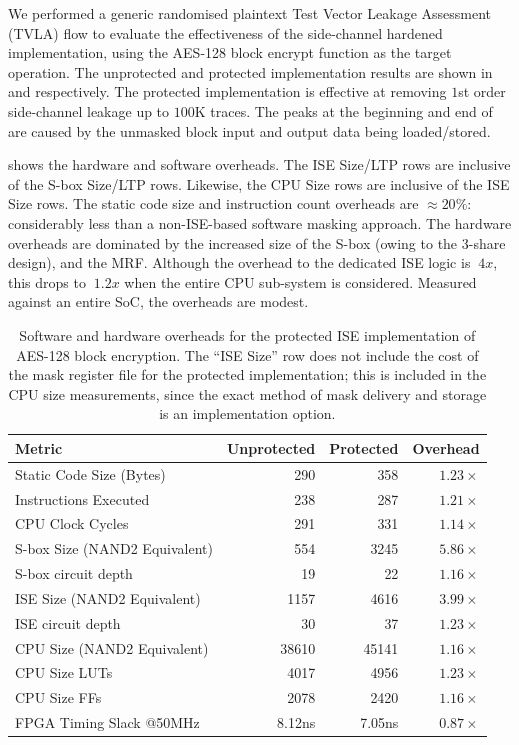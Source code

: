 We performed a generic randomised plaintext
Test Vector Leakage Assessment (TVLA) \cite{TVLA:13}
flow to evaluate the effectiveness of the side-channel hardened implementation,
using the AES-128 block encrypt function as the target operation.
The unprotected and protected implementation results are shown in
 and
 respectively.
The protected implementation is effective at removing $1$st
order side-channel leakage up to $100$K traces.
The peaks at the beginning and end of 
are caused by the unmasked block input and output data being loaded/stored.

 shows the hardware and software overheads.
The ISE Size/LTP rows are inclusive of the S-box Size/LTP rows.
Likewise, the CPU Size rows are inclusive of the ISE Size rows.
The static code size and instruction count overheads are
$\approx 20\%$: considerably less than a non-ISE-based software masking
approach.
The hardware overheads are dominated by the increased size of the
S-box (owing to the 3-share design), and the MRF.
Although the overhead to the dedicated
ISE logic is $~4x$, this drops to $~1.2x$ when the entire
CPU sub-system is considered.
Measured against an entire SoC, the overheads are modest.

\begin{table}[]
\centering
\begin{tabular}{|l|r|r|r|}
\hline
Metric  & Unprotected & Protected  & Overhead \\
\hline
\hline
Static Code Size (Bytes)        & 290         & 358    & $1.23\times$   \\
Instructions Executed           & 238         & 287    & $1.21\times$   \\
CPU Clock Cycles                & 291         & 331    & $1.14\times$   \\
\hline
S-box Size (NAND2 Equivalent)   & 554         & 3245   & $5.86\times$   \\
S-box circuit depth             & 19          & 22     & $1.16\times$   \\
ISE Size (NAND2 Equivalent)     & 1157        & 4616   & $3.99\times$   \\
ISE circuit depth               & 30          & 37     & $1.23\times$   \\
CPU Size (NAND2 Equivalent)     & 38610       & 45141  & $1.16\times$   \\
CPU Size  LUTs                  & 4017        & 4956   & $1.23\times$   \\
CPU Size  FFs                   & 2078        & 2420   & $1.16\times$   \\
FPGA Timing Slack @50MHz        & 8.12ns      & 7.05ns & $0.87\times$   \\
\hline
\end{tabular}
\caption{
Software and hardware overheads for the protected ISE implementation
of AES-128 block encryption.
The ``ISE Size'' row does not include the cost of the mask register file
for the protected implementation;
this is included in the CPU size measurements, since the exact method
of mask delivery and storage is an implementation option.
}
\label{tab:sca:sw-hw}
\end{table}

